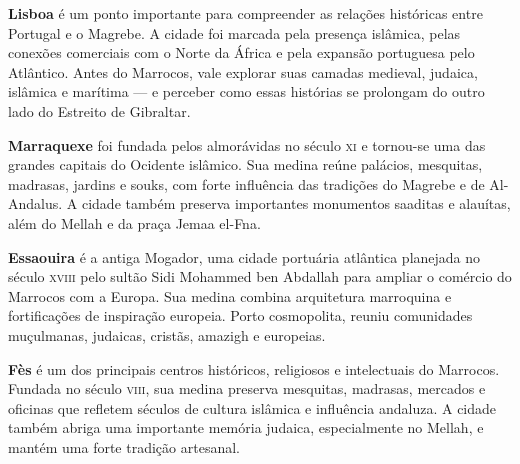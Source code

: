 \textbf{Lisboa} é um ponto importante para compreender as relações históricas entre Portugal e o Magrebe. A cidade foi marcada pela presença islâmica, pelas conexões comerciais com o Norte da África e pela expansão portuguesa pelo Atlântico. Antes do Marrocos, vale explorar suas camadas medieval, judaica, islâmica e marítima --- e perceber como essas histórias se prolongam do outro lado do Estreito de Gibraltar.

\textbf{Marraquexe} foi fundada pelos almorávidas no século \textsc{xi} e tornou-se uma das grandes capitais do Ocidente islâmico. Sua medina reúne palácios, mesquitas, madrasas, jardins e souks, com forte influência das tradições do Magrebe e de Al-Andalus. A cidade também preserva importantes monumentos saaditas e alauítas, além do Mellah e da praça Jemaa el-Fna. 

\textbf{Essaouira} é a antiga Mogador, uma cidade portuária atlântica planejada no século \textsc{xviii} pelo sultão Sidi Mohammed ben Abdallah para ampliar o comércio do Marrocos com a Europa. Sua medina combina arquitetura marroquina e fortificações de inspiração europeia. Porto cosmopolita, reuniu comunidades muçulmanas, judaicas, cristãs, amazigh e europeias.

\textbf{Fès} é um dos principais centros históricos, religiosos e intelectuais do Marrocos. Fundada no século \textsc{viii}, sua medina preserva mesquitas, madrasas, mercados e oficinas que refletem séculos de cultura islâmica e influência andaluza. A cidade também abriga uma importante memória judaica, especialmente no Mellah, e mantém uma forte tradição artesanal. 


